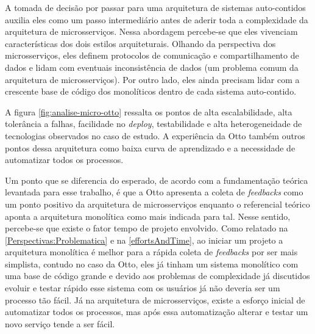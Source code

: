 A tomada de decisão por passar para uma arquitetura de sistemas auto-contidos auxilia eles como um
passo intermediário antes de aderir toda a complexidade da arquitetura de microsserviços. Nessa
abordagem percebe-se que eles vivenciam características dos dois estilos arquiteturais. Olhando da
perspectiva dos microsserviços, eles definem protocolos de comunicação e compartilhamento de dados e lidam
com eventuais inconsistência de dados (um problema comum da arquitetura de microsserviços). Por
outro lado, eles ainda precisam lidar com a crescente base de código dos monolíticos dentro de cada
sistema auto-contido.

A figura \autoref{fig:analise-micro-otto} ressalta os pontos de alta escalabilidade, alta
tolerância a falhas, facilidade no \textit{deploy}, testabilidade e alta heterogeneidade de
tecnologias observados no caso de estudo. A experiência da Otto também outros pontos dessa
arquitetura como baixa curva de aprendizado e a necessidade de automatizar todos os
processos.  

Um ponto que se diferencia do esperado, de acordo com a fundamentação teórica levantada para esse
trabalho, é que a Otto apresenta a coleta de \textit{feedbacks} como um ponto positivo da
arquitetura de microsserviços enquanto o referencial teórico aponta a arquitetura monolítica como
mais indicada para tal. Nesse sentido, percebe-se que existe o fator tempo de projeto envolvido.
Como relatado na \autoref{Perspectivas:Problematica} e na \autoref{effortsAndTime}, ao iniciar um
projeto a arquitetura monolítica é melhor para a rápida coleta de \textit{feedbacks} por ser mais
simplista, contudo no caso da Otto, eles já tinham um sistema monolítico com uma base de código
grande e devido aos problemas de complexidade já discutidos evoluir e testar rápido esse sistema com
os usuários já não deveria ser um processo tão fácil. Já na arquitetura de microsserviços, existe a
esforço inicial de automatizar todos os processos, mas após essa automatização alterar e testar um
novo serviço tende a ser fácil.

